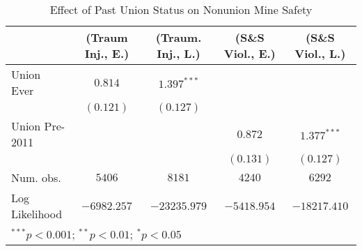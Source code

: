 
\begin{table}[H]
\begin{center}
\begin{tabular}{l c c c c}
\hline
 & (Traum Inj., E.) & (Traum. Inj., L.) & (S\&S Viol., E.) & (S\&S Viol., L.) \\
\hline
Union Ever     & $0.814$     & $1.397^{***}$ &             &               \\
               & $(0.121)$   & $(0.127)$     &             &               \\
Union Pre-2011 &             &               & $0.872$     & $1.377^{***}$ \\
               &             &               & $(0.131)$   & $(0.127)$     \\
\hline
Num. obs.      & $5406$      & $8181$        & $4240$      & $6292$        \\
Log Likelihood & $-6982.257$ & $-23235.979$  & $-5418.954$ & $-18217.410$  \\
\hline
\multicolumn{5}{l}{\scriptsize{$^{***}p<0.001$; $^{**}p<0.01$; $^{*}p<0.05$}}
\end{tabular}
\caption{Effect of Past Union Status on Nonunion Mine Safety}
\label{irr_100employees_union_inertia}
\end{center}
\end{table}

